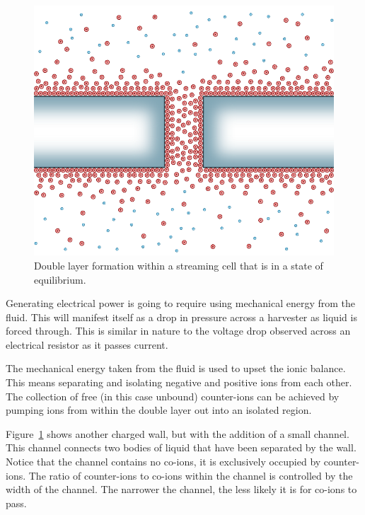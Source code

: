   \begin{figure}
      \centering
      \includegraphics{content/pt1/01-PowerHarvesting/graphics/intro_2_channel_relaxed}
      \caption{\label{fig:doubleLayerInChannel_noPressure}Double layer formation within a streaming cell that is in a state of equilibrium.}
  \end{figure}

  Generating electrical power is going to require using mechanical energy from the fluid.
  This will manifest itself as a drop in pressure across a harvester as liquid is forced through.
  This is similar in nature to the voltage drop observed across an electrical resistor as it passes current.

  The mechanical energy taken from the fluid is used to upset the ionic balance.
  This means separating and isolating negative and positive ions from each other.
  The collection of free (in this case unbound) counter-ions can be achieved by pumping ions from within the double layer out into an isolated region.

  Figure~\ref{fig:doubleLayerInChannel_noPressure} shows another charged wall, but with the addition of a small channel.
  This channel connects two bodies of liquid that have been separated by the wall.
  Notice that the channel contains no co-ions, it is exclusively occupied by counter-ions.
  The ratio of counter-ions to co-ions within the channel is controlled by the width of the channel.
  The narrower the channel, the less likely it is for co-ions to pass.

